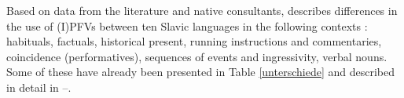 \documentclass[output=paper,colorlinks,citecolor=brown]{langscibook}
\begin{document}
Based on data from the literature and native consultants, \citet{Dickey2000} describes differences in the use of (I)PFVs between ten Slavic languages in the following contexts%
: habituals, factuals, historical present, running instructions and commentaries, coincidence (performatives), sequences of events and ingressivity, verbal nouns. Some of these have already been presented in Table \ref{unterschiede} and described in detail in --. %
%
%
%
\iffalse 
\end{document}
